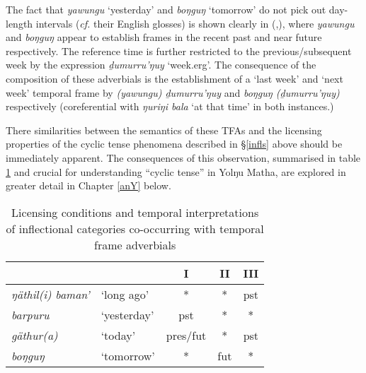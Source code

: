 The fact that \textit{yawungu} `yesterday' and \textit{boŋguŋ} `tomorrow' do not pick out day-length intervals (\textit{cf.} their English glosses)  is shown clearly in (,), where \textit{yawungu} and \textit{boŋguŋ} appear to establish frames in the recent past and near future respectively. The reference time is further restricted to the previous/subsequent week by the expression \textit{ḏumurru'ŋuy} `week.\gls{erg}'. The consequence of the composition of these adverbials is the establishment of a `last week' and `next week' temporal frame by \textit{(yawungu) ḏumurru'ŋuy} and \textit{boŋguŋ (ḏumurru'ŋuy)} respectively (coreferential with \textit{ŋuriŋi bala} `at that time' in both instances.)

There similarities between the semantics of these TFAs and the licensing properties of the cyclic tense phenomena described in §\ref{infls} above should be immediately apparent. The consequences of this observation, summarised in table \ref{tfa/infl} and crucial for understanding ``cyclic tense'' in Yolŋu Matha, are explored in greater detail in Chapter \ref{anY} below.


\begin{table}\centering
	\begin{tabular}{llccc}
		&& \textbf{I} & \textbf{II} & \textbf{III}\\\midrule
	\textit{ŋäthil(i) baman'}& `long ago' & * & * & \gls{pst} \\
	\textit{barpuru}& `yesterday'	& \gls{pst} & * & *	\\
	\textit{gäthur(a)}& `today'	& \gls{pres}/\gls{fut} & * & \gls{pst}	\\
	\textit{boŋguŋ}& `tomorrow'		& * & \gls{fut} & * \\\bottomrule			
	\end{tabular}
\caption{Licensing conditions and temporal interpretations of inflectional categories co-occurring with temporal frame adverbials}\label{tfa/infl}
\end{table}

